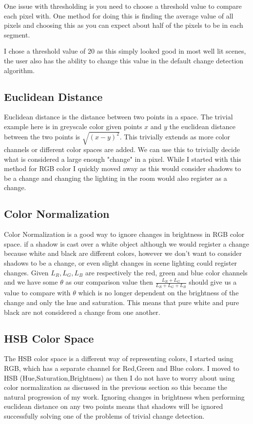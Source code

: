 \documentclass[a4paper]{report}
\begin{document}
One issue with thresholding is you need to choose a threshold value to compare each pixel with. One method for doing this is finding the average value of all pixels and choosing this as you can expect about half of the pixels to be in each segment.

I chose a threshold value of 20 as this simply looked good in most well lit scenes, the user also has the ability to change this value in the default change detection algorithm.
\subsection{Euclidean Distance}
Euclidean distance is the distance between two points in a space. The trivial example here is in greyscale color given points $x$ and $y$ the euclidean distance between the two points is $\sqrt{(x-y)^2}$. This trivially extends as more color channels or different color spaces are added. We can use this to trivially decide what is considered a large enough "change" in a pixel. While I started with this method for RGB color I quickly moved away as this would consider shadows to be a change and changing the lighting in the room would also register as a change.

\subsection{Color Normalization}
Color Normalization is a good way to ignore changes in brightness in RGB color space. if a shadow is cast over a white object although we would register a change because white and black are different colors, however we don't want to consider shadows to be a change, or even slight changes in scene lighting could register changes. Given $L_R,L_G,L_B$ are respectively the red, green and blue color channels and we have some $\theta$ as our comparison value then $\frac{L_R + L_G}{L_R + L_G + L_B}$ should give us a value to compare with $\theta$ which is no longer dependent on the brightness of the change and only the hue and saturation. This means that pure white and pure black are not considered a change from one another.

\subsection{HSB Color Space}
The HSB color space is a different way of representing colors, I started using RGB, which has a separate channel for Red,Green and Blue colors. I moved to HSB (Hue,Saturation,Brightness) as then I do not have to worry about using color normalization as discussed in the previous section so this became the natural progression of my work. Ignoring changes in brightness when performing euclidean distance on any two points means that shadows will be ignored successfully solving one of the problems of trivial change detection.
\end{document}
